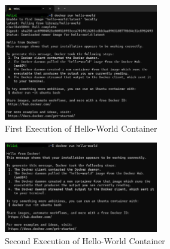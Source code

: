 \begin{figure}
    \centering
    \includegraphics[width=0.6\textwidth]{figures/microservices/dmCar/ms_dmCar_dockerHelloWorldFirstExecution.png}
    \caption{First Execution of Hello-World Container}
    \label{fig:docker_hello_world_first_execution}
\end{figure}

\begin{figure}
    \centering
    \includegraphics[width=0.6\textwidth]{figures/microservices/dmCar/ms_dmCar_dockerHelloWorldSecondExecution.png}
    \caption{Second Execution of Hello-World Container}
    \label{fig:docker_hello_world_second_execution}
\end{figure}